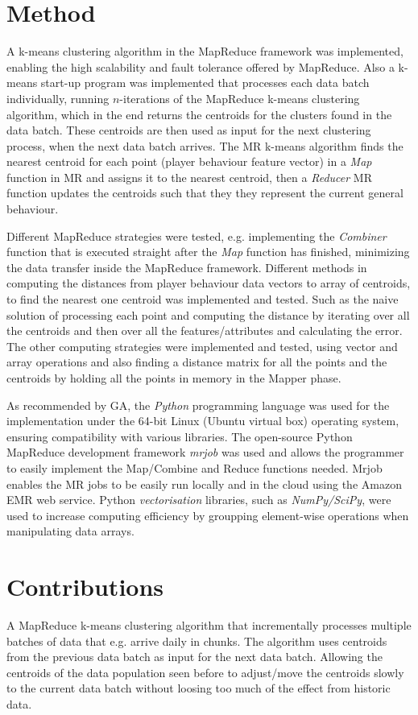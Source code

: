 \section{Method}
A k-means clustering algorithm in the MapReduce framework was implemented, enabling the high scalability and fault tolerance offered by MapReduce. Also a k-means start-up program was implemented that processes each data batch individually, running $n$-iterations of the MapReduce k-means clustering algorithm, which in the end returns the centroids for the clusters found in the data batch. These centroids are then used as input for the next clustering process, when the next data batch arrives. The MR k-means algorithm finds the nearest centroid for each point (player behaviour feature vector) in a \textit{Map} function in MR and assigns it to the nearest centroid, then a \textit{Reducer} MR function updates the centroids such that they they represent the current general behaviour.

Different MapReduce strategies were tested, e.g. implementing the \textit{Combiner} function that is executed straight after the \textit{Map} function has finished, minimizing the data transfer inside the MapReduce framework. Different methods in computing the distances from player behaviour data vectors to array of centroids, to find the nearest one centroid was implemented and tested. Such as the naive solution of processing each point and computing the distance by iterating over all the centroids and then over all the features/attributes and calculating the error. The other computing strategies were implemented and tested, using vector and array operations and also finding a distance matrix for all the points and the centroids by holding all the points in memory in the Mapper phase.

As recommended by GA, the \textit{Python} programming language was used for the implementation under the 64-bit Linux (Ubuntu virtual box) operating system, ensuring compatibility with various libraries. The open-source Python MapReduce development framework \textit{mrjob} was used and allows the programmer to easily implement the Map/Combine and Reduce functions needed. Mrjob enables the MR jobs to be easily run locally and in the cloud using the Amazon EMR web service. Python \textit{vectorisation} libraries, such as \textit{NumPy/SciPy}, were used to increase computing efficiency by groupping element-wise operations when manipulating data arrays. 

\section{Contributions}
A MapReduce k-means clustering algorithm that incrementally processes multiple batches of data that e.g. arrive daily in chunks. The algorithm uses centroids from the previous data batch as input for the next data batch. Allowing the centroids of the data population seen before to adjust/move the centroids slowly to the current data batch without loosing too much of the effect from historic data.

